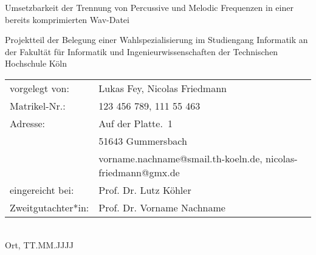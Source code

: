 \begin{titlepage}
%
\sffamily%
%
\begin{center}
\end{center}
%
\vfill
%
\begin{huge}
Umsetzbarkeit der Trennung von Percussive und Melodic Frequenzen in einer bereits komprimierten Wav-Datei\\[10mm]
\end{huge}
%
Projektteil der Belegung einer Wahlspezialisierung\newline
im Studiengang Informatik\newline
an der Fakultät für Informatik und Ingenieurwissenschaften\newline
der Technischen Hochschule Köln
%
\vfill
%
\begin{tabular}{@{}ll}
vorgelegt von: & Lukas Fey, Nicolas Friedmann\\
Matrikel-Nr.:  & 123 456 789, 111 55 463\\
Adresse:       & Auf der Platte.~1\\
               & 51643 Gummersbach\\
               & vorname.nachname@smail.th-koeln.de, nicolas-friedmann@gmx.de\\[5mm]
eingereicht bei:   & Prof. Dr. Lutz Köhler\\
Zweitgutachter*in: & Prof. Dr. Vorname Nachname
\end{tabular}	
%
\\[10mm]
%
Ort, TT.MM.JJJJ%
%
\rmfamily%
%
\end{titlepage}